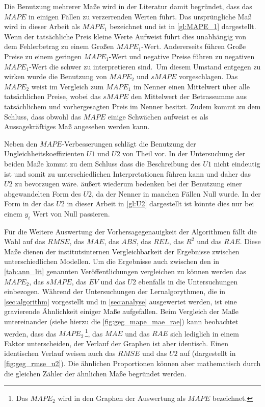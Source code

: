 Die Benutzung mehrerer Maße wird in der Literatur damit begründet, dass das $MAPE$ in einigen Fällen zu verzerrenden Werten führt. Das ursprüngliche Maß wird in dieser Arbeit als $MAPE_1$ bezeichnet und ist in \autoref{gl:MAPE_1} dargestellt. Wenn der tatsächliche Preis kleine Werte Aufweist führt dies unabhängig von dem Fehlerbetrag zu einem Großen $MAPE_1$-Wert. Andererseits führen Große Preise zu einem geringen $MAPE_1$-Wert und negative Preise führen zu negativen $MAPE_1$-Wert die schwer zu interpretieren sind.\, Um diesem Umstand entgegen zu wirken wurde die Benutzung von $MAPE_2$ und $sMAPE$ vorgeschlagen. Das $MAPE_2$ weist im Vergleich zum $MAPE_1$ im Nenner einen Mittelwert über alle tatsächlichen Preise, wobei das $sMAPE$ den Mittelwert der Betrassumme aus tatsächlichem und vorhergesagten Preis im Nenner besitzt. Zudem kommt \citet{Makridakis1993} zu dem Schluss, dass obwohl das $MAPE$ einige Schwächen aufweist es als Aussagekräftiges Maß angesehen werden kann.

Neben den $MAPE$-Verbesserungen schlägt \citet{Panapakidis2016} die Benutzung der Ungleichheitskoeffizienten $U1$ und $U2$ von Theil vor. In der Untersuchung der beiden Maße kommt \citet{Bliemel1973} zu dem Schluss dass die Beschreibung des $U1$ nicht eindeutig ist und somit zu unterschiedlichen Interpretationen führen kann und daher das $U2$ zu bevorzugen wäre. \citet{Makridakis1993} äußert wiederum bedenken bei der Benutzung einer abgewandelten Form des $U2$, da der Nenner in manchen Fällen Null wurde. In der Form in der das $U2$ in dieser Arbeit in \autoref{gl:U2} dargestellt ist könnte dies nur bei einem $y_i$ Wert von Null passieren.

Für die Weitere Auswertung der Vorhersagegenauigkeit der Algorithmen fällt die Wahl auf das $RMSE$, das $MAE$, das $ABS$, das $REL$, das $R^2$ und das $RAE$. Diese Maße dienen der institutsinternen Vergleichbarkeit der Ergebnisse zwischen unterschiedlichen Modellen. Um die Ergebnisse auch zwischen den in \autoref{tab:ann_lit} genannten Veröffentlichungen vergleichen zu können werden das $MAPE_2$, das $sMAPE$, das $EV$ und das $U2$ ebenfalls in die Untersuchungen einbezogen.
Während der Untersuchungen der Lernalgorythmen, die in \autoref{sec:algorithm} vorgestellt und in \autoref{sec:analyse} ausgewertet werden, ist eine gravierende Ähnlichkeit einiger Maße aufgefallen. Beim Vergleich der Maße untereinander (siehe hierzu die \autoref{fig:geg_mape_mae_rae}) kann beobachtet werden, dass das $MAPE_2$\,\footnote{Das $MAPE_2$ wird in den Graphen der Auswertung als $MAPE$ bezeichnet.}, das $MAE$ und das $RAE$ sich lediglich in einem Faktor unterscheiden, der Verlauf der Graphen ist aber identisch. Einen identischen Verlauf weisen auch das $RMSE$ und das $U2$ auf (dargestellt in \autoref{fig:geg_rmse_u2}). Die ähnlichen Proportionen können aber mathematisch durch die gleichen Zähler der ähnlichen Maße begründet werden. 

